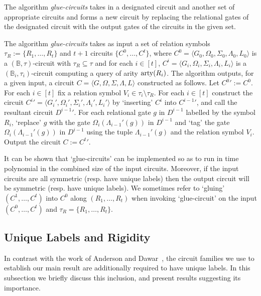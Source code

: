 \documentclass[../paper.tex]{subfiles}
\begin{document}
The algorithm \emph{glue-circuits} takes in a designated circuit and another set
of appropriate circuits and forms a new circuit by replacing the relational
gates of the designated circuit with the output gates of the circuits in the
given set.

\begin{definition}
  The algorithm \emph{glue-circuits} takes as input a set of relation symbols
  $\tau_R := \{R_1, \ldots, R_t\}$ and $t+1$ circuits $\{C^0, \ldots, C^{t}\}$,
  where $C^0 = \langle G_0, \Omega_0, \Sigma_0, \Lambda_0, L_0 \rangle$ is a
  $(\mathbb{B}, \tau)$-circuit with $\tau_R \subseteq \tau$ and for each $i \in
  [t]$, $C^i = \langle G_i, \Omega_i, \Sigma_i, \Lambda_i, L_i \rangle$ is a
  $(\mathbb{B}_i, \tau_i)$-circuit computing a query of arity $\mathrm{arty}(R_i)$. The
  algorithm outputs, for a given input, a circuit $C = \langle G, \Omega,
  \Sigma, \Lambda, L\rangle$ constructed as follows. Let ${C^0}' := C^0$. For
  each $i \in [t]$ fix a relation symbol $V_i \in \tau_i \setminus \tau_R$. For
  each $i \in [t]$ construct the circuit ${C^{i}}' = \langle G_i', \Omega_i',
  \Sigma_i', \Lambda_i', L_i' \rangle $ by `inserting' $C^i$ into ${C^{i-1}}'$,
  and call the resultant circuit ${D^{i-1}}'$. For each relational gate $g$ in
  $D^{i-1}$ labelled by the symbol $R_i$, `replace' $g$ with the gate
  $\Omega_{i}(\Lambda_{i-1}'(g))$ in $D^{i-1}$ and `tag' the gate
  $\Omega_i(\Lambda_{i-1}'(g))$ in $D^{i-1}$ using the tuple $\Lambda_{i-1}'(g)$
  and the relation symbol $V_i$. Output the circuit $C := {C^t}'$.
\end{definition}

It can be shown that `glue-circuits' can be implemented so as to run in time
polynomial in the combined size of the input circuits. Moreover, if the input
circuits are all symmetric (resp. have unique labels) then the output circuit
will be symmetric (resp. have unique labels). We sometimes refer to `gluing'
$(C^1, \ldots, C^t)$ into $C^0$ along $(R_1 , \ldots , R_t)$ when invoking
`glue-circuit' on the input $(C^0, \ldots , C^t)$ and $\tau_R = \{R_1, \ldots ,
R_t\}$.

\subsection{Unique Labels and Rigidity}
In contrast with the work of Anderson and Dawar~\cite{}, the circuit families we
use to establish our main result are additionally required to have unique
labels. In this subsection we briefly discuss this inclusion, and present
results suggesting its importance.
\end{document}
